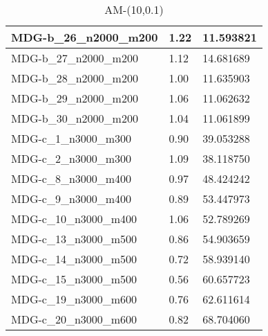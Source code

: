 \documentclass[10pt,a4paper]{article}
\begin{document}
\begin{table}[]
\begin{tabular}{|l|l|l|}
		MDG-b\_26\_n2000\_m200 & 1.22                               & 11.593821                            \\ \hline
		MDG-b\_27\_n2000\_m200 & 1.12                               & 14.681689                            \\ \hline
		MDG-b\_28\_n2000\_m200 & 1.00                               & 11.635903                            \\ \hline
		MDG-b\_29\_n2000\_m200 & 1.06                               & 11.062632                            \\ \hline
		MDG-b\_30\_n2000\_m200 & 1.04                               & 11.061899                            \\ \hline
		MDG-c\_1\_n3000\_m300  & 0.90                               & 39.053288                            \\ \hline
		MDG-c\_2\_n3000\_m300  & 1.09                               & 38.118750                            \\ \hline
		MDG-c\_8\_n3000\_m400  & 0.97                               & 48.424242                            \\ \hline
		MDG-c\_9\_n3000\_m400  & 0.89                               & 53.447973                            \\ \hline
		MDG-c\_10\_n3000\_m400 & 1.06                               & 52.789269                            \\ \hline
		MDG-c\_13\_n3000\_m500 & 0.86                               & 54.903659                            \\ \hline
		MDG-c\_14\_n3000\_m500 & 0.72                               & 58.939140                            \\ \hline
		MDG-c\_15\_n3000\_m500 & 0.56                               & 60.657723                            \\ \hline
		MDG-c\_19\_n3000\_m600 & 0.76                               & 62.611614                            \\ \hline
		MDG-c\_20\_n3000\_m600 & 0.82                               & 68.704060                            \\ \hline
	\end{tabular}
	\caption{AM-(10,0.1)}
	\label{table:AM2}
\end{table}
\end{document}
